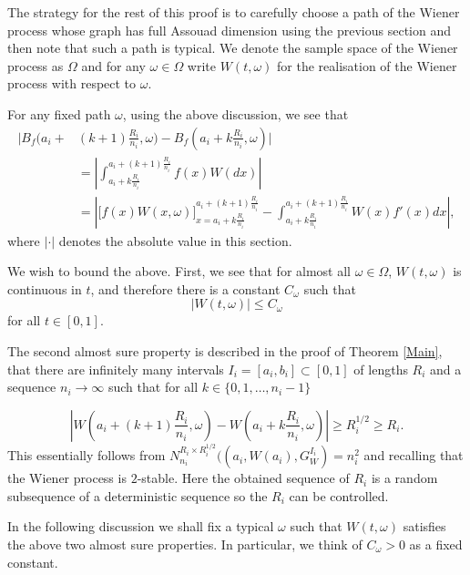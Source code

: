 	The strategy for the rest of this proof is to carefully choose a path of the Wiener process whose graph has full Assouad dimension using the previous section and then note that such a path is typical. We denote the sample space of the Wiener process as $\Omega$ and for any $\omega \in \Omega$ write $W(t,\omega)$ for the realisation of the Wiener process with respect to $\omega$.
	
	For any fixed path $\omega$, using the above discussion, we see that
	\begin{align}\label{ch-brownian:stochastic-int}
		\bigg\vert B_f\bigg(a_i+&(k+1)\frac{R_i}{n_i},\omega\bigg)-B_f\left(a_i+k\frac{R_i}{n_i},\omega\right)\bigg\vert \nonumber \\
		&= \left| \int_{a_i+k\frac{R_i}{n_i}}^{a_i+(k+1)\frac{R_i}{n_i}} f(x)W(dx)\right| \nonumber\\
		&= \left| \bigg[f\left(x\right)W(x,\omega)\bigg]_{x=a_i+k\frac{R_i}{n_i}}^{a_i+(k+1)\frac{R_i}{n_i}} - \int_{a_i+k\frac{R_i}{n_i}}^{a_i+(k+1)\frac{R_i}{n_i}} W(x)f'(x)dx \right|,
	\end{align}
	where $\lvert \cdot \rvert$ denotes the absolute value in this section.
	
	We wish to bound the above. First, we see that for almost all $\omega\in\Omega$, $W(t,\omega)$ is continuous in $t$, and therefore there is a constant $C_\omega$ such that
	\begin{equation}
	    |W(t,\omega)|\leq C_\omega \label{first-equa}
	\end{equation}
	for all $t\in [0,1]$. 
	
	The second almost sure property is described in the proof of Theorem \ref{Main}, that there are infinitely many intervals $I_i=[a_i,b_i]\subset [0,1]$ of lengths $R_i$ and a sequence $n_i\to\infty$ such that for all $k\in\{0,1,\dots,n_i-1\}$
	
	\begin{equation}
	    \left|W\left(a_i+(k+1)\frac{R_i}{n_i},\omega\right)-W\left(a_i+k\frac{R_i}{n_i},\omega\right)\right|\geq R_i^{1/2}\geq R_i. \label{ch:brownian:second-equa}
	\end{equation}
	This essentially follows from $N_{n_i}^{R_i \times R_i^{1/2}}((a_i,W(a_i), G_W^{I_i})  = n_i^2$ and recalling that the Wiener process is $2$-stable. Here the obtained sequence of $R_i$ is a random subsequence of a deterministic sequence so the $R_i$ can be controlled.
	
	In the following discussion we shall fix a typical $\omega$ such that $W(t,\omega)$ satisfies the above two almost sure properties. In particular, we think of $C_\omega>0$ as a fixed constant. 
	
